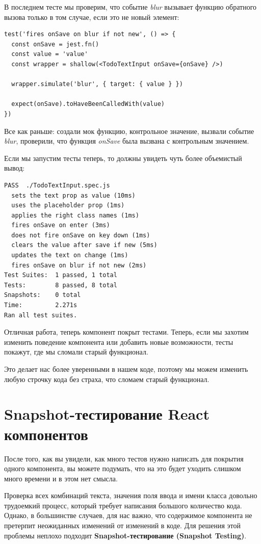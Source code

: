 В последнем тесте мы проверим, что событие \textit{blur} вызывает функцию обратного вызова только в том случае, если это не новый элемент:

\begin{lstlisting}
test('fires onSave on blur if not new', () => {
  const onSave = jest.fn()
  const value = 'value'
  const wrapper = shallow(<TodoTextInput onSave={onSave} />)
  
  wrapper.simulate('blur', { target: { value } })
  
  expect(onSave).toHaveBeenCalledWith(value)
})
\end{lstlisting}

Все как раньше: создали мок функцию, контрольное значение, вызвали событие \textit{blur}, проверили, что функция \textit{onSave} была вызвана с контрольным значением.

Если мы запустим тесты теперь, то должны увидеть чуть более объемистый вывод:

\begin{lstlisting}
PASS  ./TodoTextInput.spec.js
  sets the text prop as value (10ms)
  uses the placeholder prop (1ms)
  applies the right class names (1ms)
  fires onSave on enter (3ms)
  does not fire onSave on key down (1ms)
  clears the value after save if new (5ms)
  updates the text on change (1ms)
  fires onSave on blur if not new (2ms)
Test Suites:  1 passed, 1 total
Tests:        8 passed, 8 total
Snapshots:    0 total
Time:         2.271s
Ran all test suites.
\end{lstlisting}

Отличная работа, теперь компонент покрыт тестами. Теперь, если мы захотим изменить поведение компонента или добавить новые возможности, тесты покажут, где мы сломали старый функционал.

Это делает нас более уверенными в нашем коде, поэтому мы можем изменить любую строчку кода без страха, что сломаем старый функционал. 

\section{Snapshot-тестирование React компонентов}

После того, как вы увидели, как много тестов нужно написать для покрытия одного компонента, вы можете подумать, что на это будет уходить слишком много времени и в этом нет смысла.

Проверка всех комбинаций текста, значения поля ввода и имени класса довольно трудоемкий процесс, который требует написания большого количество кода. Однако, в большинстве случаев, для нас важно, что содержимое компонента не претерпит неожиданных изменений от изменений в коде. Для решения этой проблемы неплохо подходит \textbf{Snapshot-тестирование (Snapshot Testing)}.

